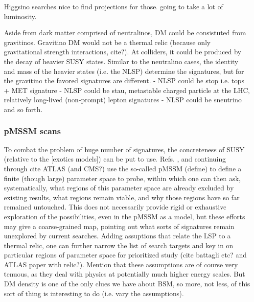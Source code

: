 Higgsino searches nice to find projections for those. going to take a lot of luminosity.

Aside from dark matter comprised of neutralinos, DM could be consistuted from gravitinos. Gravitino DM would not be a thermal relic (because only gravitational strength interactions, cite?). At colliders, it could be produced by the decay of heavier SUSY states. Similar to the neutralino cases, the identity and mass of the heavier states (i.e. the NLSP) determine the signatures, but for the gravitino the favored signatures are different. 
- NLSP could be stop i.e. tops + MET signature
- NLSP could be stau, metastable charged particle at the LHC, relatively long-lived (non-prompt) lepton signatures
- NLSP could be sneutrino and so forth.




\subsubsection{pMSSM scans}

To combat the problem of huge number of signatures, the concreteness of SUSY (relative to the [exotics models]) can be put to use. Refs. \cite{10.1140/epjc/s10052-011-1697-z}, and continuing through cite ATLAS (and CMS?) use the so-called pMSSM (define) to define a finite (though large) parameter space to probe, within which one can then ask, systematically, what regions of this parameter space are already excluded by existing results, what regions remain viable, and why those regions have so far remained untouched. This does not necessarily provide rigid or exhaustive exploration of the possibilities, even in the pMSSM as a model, but these efforts may give a coarse-grained map, pointing out what sorts of signatures remain unexplored by current searches. Adding assuptions that relate the LSP to a thermal relic, one can further narrow the list of search targets and key in on particular regions of parameter space for prioritized study (cite battagli etc? and ATLAS paper with relic?). Mention that these assumptions are of course very tenuous, as they deal with physics at potentially much higher energy scales. But DM density is one of the only clues we have about BSM, so more, not less, of this sort of thing is interesting to do (i.e. vary the assumptions).

